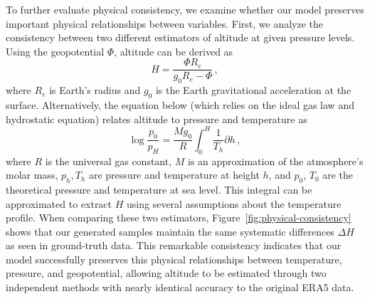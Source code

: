 \begin{subappendices}
To further evaluate physical consistency, we examine whether our model preserves important physical relationships between variables. First, we analyze the consistency between two different estimators of altitude at given pressure levels. Using the geopotential $\Phi$, altitude can be derived as
\begin{equation}
    H = \frac{\Phi R_e}{g_{0}R_e-\Phi} \, ,
\end{equation}
where $R_e$ is Earth's radius and $g_{0}$ is the Earth gravitational acceleration at the surface. Alternatively, the equation below (which relies on the ideal gas law and hydrostatic equation) relates altitude to pressure and temperature as
\begin{equation}
    \log{\frac{p_0}{p_H}} = \frac{M g_0}{R}\int_0^H \frac{1}{T_h} \partial{h} \, ,
\end{equation}
where $R$ is the universal gas constant, $M$ is an approximation of the atmosphere's molar mass, $p_h, T_h$ are pressure and temperature at height $h$, and $p_0$, $T_0$ are the theoretical pressure and temperature at sea level. This integral can be approximated to extract $H$ using several assumptions about the temperature profile. When comparing these two estimators, Figure~\ref{fig:physical-consistency} shows that our generated samples maintain the same systematic differences $\Delta H$ as seen in ground-truth data. This remarkable consistency indicates that our model successfully preserves this physical relationships between temperature, pressure, and geopotential, allowing altitude to be estimated through two independent methods with nearly identical accuracy to the original ERA5 data.


\end{subappendices}
